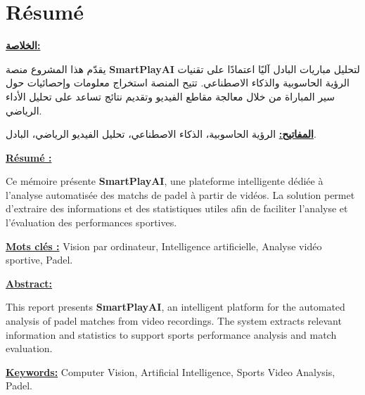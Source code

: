 \chapter*{Résumé}

\begin{otherlanguage}{arabic}
\textbf{\underline{الخلاصة:}}

يقدّم هذا المشروع منصة \textbf{SmartPlayAI} لتحليل مباريات البادل آليًا اعتمادًا على تقنيات الرؤية الحاسوبية والذكاء الاصطناعي. تتيح المنصة استخراج معلومات وإحصائيات حول سير المباراة من خلال معالجة مقاطع الفيديو وتقديم نتائج تساعد على تحليل الأداء الرياضي.

\vspace{0.3cm}
\textbf{\underline{المفاتيح:}}
الرؤية الحاسوبية، الذكاء الاصطناعي، تحليل الفيديو الرياضي، البادل.
\end{otherlanguage}

\vspace{1cm}

\textbf{\underline{Résumé :}}

\noindent
Ce mémoire présente \textbf{SmartPlayAI}, une plateforme intelligente dédiée à l'analyse automatisée des matchs de padel à partir de vidéos. La solution permet d'extraire des informations et des statistiques utiles afin de faciliter l'analyse et l'évaluation des performances sportives.

\vspace{0.3cm}

\textbf{\underline{Mots clés :}}
Vision par ordinateur, Intelligence artificielle, Analyse vidéo sportive, Padel.

\vspace{1cm}

\textbf{\underline{Abstract:}}

\noindent
This report presents \textbf{SmartPlayAI}, an intelligent platform for the automated analysis of padel matches from video recordings. The system extracts relevant information and statistics to support sports performance analysis and match evaluation.

\vspace{0.3cm}

\textbf{\underline{Keywords:}}
Computer Vision, Artificial Intelligence, Sports Video Analysis, Padel.
